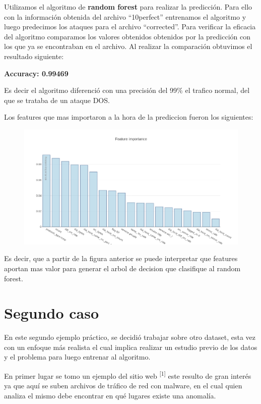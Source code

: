 \documentclass[a4paper,10pt]{article}
\begin{document}
Utilizamos el algoritmo de \textbf{random forest} para realizar la predicción. Para ello con la información obtenida del archivo “10perfect” entrenamos el algoritmo y luego predecimos los ataques para el archivo “corrected”. Para verificar la eficacia del algoritmo comparamos los valores obtenidos obtenidos por la predicción con los que ya se encontraban en el archivo. Al realizar la comparación obtuvimos el resultado siguiente:

\textbf{Accuracy: 0.99469}


\medskip

\normalsize Es decir el algoritmo diferenció con una precisión del 99\% el trafico normal, del que se trataba de un ataque DOS.


Los features que mas importaron a la hora de la prediccion fueron los siguientes:
\begin{figure}[!hbp]
\centering
\includegraphics[scale=0.4]{Wireshark/newplot(5).png} 
\caption{}
\end{figure}

Es decir, que a partir de la figura anterior se puede interpretar que features aportan mas valor para generar el arbol de decision que clasifique al random forest.



\newpage
\section{Segundo caso}


En este segundo ejemplo práctico, se decidió trabajar sobre otro dataset, esta vez con un enfoque más realista el cual implica realizar un estudio previo de los datos y el problema para luego entrenar al algoritmo.

\medskip
En primer lugar se tomo un ejemplo del sitio web \textsuperscript{[1]} este resulto de gran interés ya que aquí se suben archivos de tráfico de red con malware, en el cual quien analiza el mismo debe encontrar en qué lugares existe una anomalía.
\end{document}
